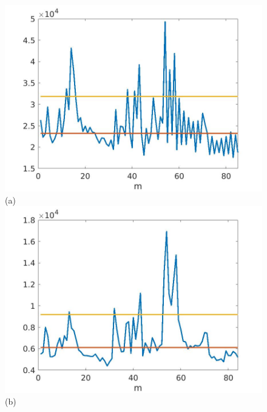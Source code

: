 \documentclass[journal]{IEEEtran}
\begin{document}
\begin{figure}[htp!]
\includegraphics[scale=.12]{../../figs/J3_VH_squared_meandev}(a)
\includegraphics[scale=.12]{../../figs/consecdif_J3_VH_squared_meandev}(b)


\end{figure}
\end{document}
